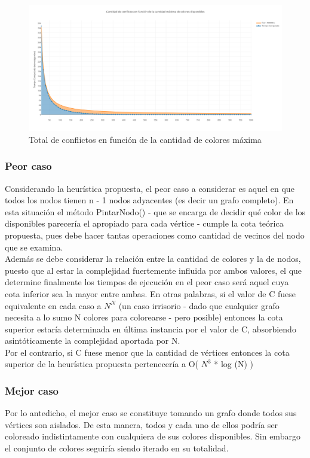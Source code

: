  \begin{figure}[H]
    \begin{center}
  	\includegraphics[width=18cm]{imagenes/Ej3/coloresconflicto.png}
 	\caption{Total de conflictos en función de la cantidad de colores máxima}
 	\label{coloresconflicto}
    \end{center}
  \end{figure}

\subsubsection{Peor caso}
Considerando la heurística propuesta, el peor caso a considerar es aquel en que todos los nodos tienen n - 1 nodos adyacentes (es decir un grafo completo). En esta situación el método PintarNodo() - que  se encarga de decidir qué color de los disponibles parecería el apropiado para cada vértice - cumple la cota teórica propuesta, pues debe hacer tantas operaciones como cantidad de vecinos del nodo que  se examina.\\

Además se debe considerar la relación entre la cantidad de colores y la de nodos, puesto que al estar la complejidad fuertemente influida por ambos valores, el que determine finalmente los tiempos de ejecución en el peor caso será aquel cuya cota inferior sea la mayor entre ambas. En otras palabras, si el valor de C fuese equivalente en cada caso a $N^{N}$  (un caso irrisorio - dado que cualquier grafo necesita a lo sumo N colores para colorearse - pero posible) entonces la cota superior estaría determinada en última instancia por el valor de C, absorbiendo asintóticamente la complejidad aportada por N. \\
Por el contrario, si C fuese menor que la cantidad de vértices entonces la cota superior de la heurística propuesta pertenecería a O( $N^{3}$ * log (N) )


\subsubsection{Mejor caso}
Por lo antedicho, el mejor caso se constituye tomando un grafo donde todos sus vértices son aislados. De esta manera, todos y cada uno de ellos podría ser coloreado indistintamente con cualquiera de sus colores disponibles. Sin embargo el conjunto de colores seguiría siendo iterado en su totalidad.



\newpage
